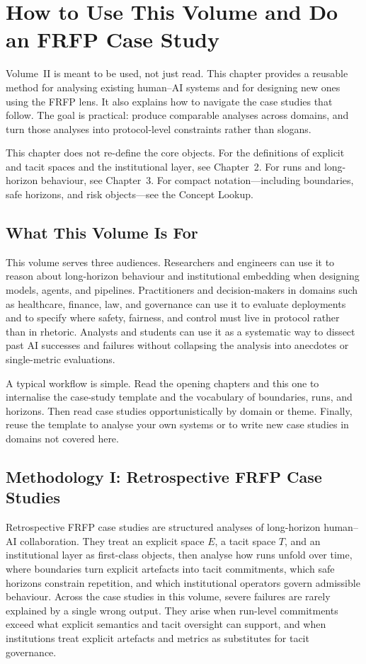 \chapter{How to Use This Volume and Do an FRFP Case Study}
\label{ch:frfp-method}

Volume~II is meant to be used, not just read. This chapter provides a reusable method for analysing existing human--AI systems and for designing new ones using the FRFP lens. It also explains how to navigate the case studies that follow. The goal is practical: produce comparable analyses across domains, and turn those analyses into protocol-level constraints rather than slogans.

This chapter does not re-define the core objects. For the definitions of explicit and tacit spaces and the institutional layer, see Chapter~2. For runs and long-horizon behaviour, see Chapter~3. For compact notation---including boundaries, safe horizons, and risk objects---see the Concept Lookup.

\section{What This Volume Is For}

This volume serves three audiences. Researchers and engineers can use it to reason about long-horizon behaviour and institutional embedding when designing models, agents, and pipelines. Practitioners and decision-makers in domains such as healthcare, finance, law, and governance can use it to evaluate deployments and to specify where safety, fairness, and control must live in protocol rather than in rhetoric. Analysts and students can use it as a systematic way to dissect past AI successes and failures without collapsing the analysis into anecdotes or single-metric evaluations.

A typical workflow is simple. Read the opening chapters and this one to internalise the case-study template and the vocabulary of boundaries, runs, and horizons. Then read case studies opportunistically by domain or theme. Finally, reuse the template to analyse your own systems or to write new case studies in domains not covered here.

\section{Methodology I: Retrospective FRFP Case Studies}
\label{sec:frfp-retrospective}

Retrospective FRFP case studies are structured analyses of long-horizon human--AI collaboration. They treat an explicit space \(E\), a tacit space \(T\), and an institutional layer as first-class objects, then analyse how runs unfold over time, where boundaries turn explicit artefacts into tacit commitments, which safe horizons constrain repetition, and which institutional operators govern admissible behaviour. Across the case studies in this volume, severe failures are rarely explained by a single wrong output. They arise when run-level commitments exceed what explicit semantics and tacit oversight can support, and when institutions treat explicit artefacts and metrics as substitutes for tacit governance.

